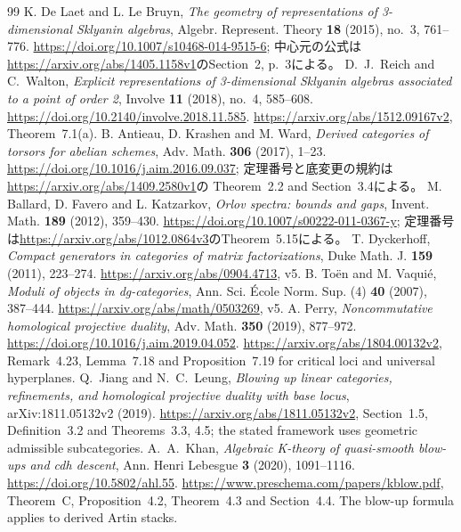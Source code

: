 \begin{thebibliography}{99}
 K. De Laet and L. Le Bruyn,
\emph{The geometry of representations of 3-dimensional Sklyanin algebras},
Algebr. Represent. Theory \textbf{18} (2015), no.~3, 761--776.
\url{https://doi.org/10.1007/s10468-014-9515-6};
中心元の公式は\url{https://arxiv.org/abs/1405.1158v1}のSection~2, p.~3による。
 D.~J.~Reich and C.~Walton,
\emph{Explicit representations of 3-dimensional Sklyanin algebras associated to a point of order 2},
Involve \textbf{11} (2018), no.~4, 585--608.
\url{https://doi.org/10.2140/involve.2018.11.585}.
\url{https://arxiv.org/abs/1512.09167v2}, Theorem~7.1(a).
 B. Antieau, D. Krashen and M. Ward,
\emph{Derived categories of torsors for abelian schemes},
Adv. Math. \textbf{306} (2017), 1--23.
\url{https://doi.org/10.1016/j.aim.2016.09.037};
定理番号と底変更の規約は\url{https://arxiv.org/abs/1409.2580v1}の
Theorem~2.2 and Section~3.4による。
 M. Ballard, D. Favero and L. Katzarkov,
\emph{Orlov spectra: bounds and gaps},
Invent. Math. \textbf{189} (2012), 359--430.
\url{https://doi.org/10.1007/s00222-011-0367-y};
定理番号は\url{https://arxiv.org/abs/1012.0864v3}のTheorem~5.15による。
 T. Dyckerhoff,
\emph{Compact generators in categories of matrix factorizations},
Duke Math. J. \textbf{159} (2011), 223--274.
\url{https://arxiv.org/abs/0904.4713}, v5.
 B. To\"en and M. Vaqui\'e,
\emph{Moduli of objects in dg-categories},
Ann. Sci. \'Ecole Norm. Sup. (4) \textbf{40} (2007), 387--444.
\url{https://arxiv.org/abs/math/0503269}, v5.
 A. Perry,
\emph{Noncommutative homological projective duality},
Adv. Math. \textbf{350} (2019), 877--972.
\url{https://doi.org/10.1016/j.aim.2019.04.052}.
\url{https://arxiv.org/abs/1804.00132v2},
Remark~4.23, Lemma~7.18 and Proposition~7.19 for critical loci and universal hyperplanes.
Q.~Jiang and N.~C.~Leung,
\emph{Blowing up linear categories, refinements, and homological projective duality with base locus},
arXiv:1811.05132v2 (2019).
\url{https://arxiv.org/abs/1811.05132v2},
Section~1.5, Definition~3.2 and Theorems~3.3, 4.5;
the stated framework uses geometric admissible subcategories.
A.~A.~Khan,
\emph{Algebraic K-theory of quasi-smooth blow-ups and cdh descent},
Ann. Henri Lebesgue \textbf{3} (2020), 1091--1116.
\url{https://doi.org/10.5802/ahl.55}.
\url{https://www.preschema.com/papers/kblow.pdf},
Theorem~C, Proposition~4.2, Theorem~4.3 and Section~4.4.
The blow-up formula applies to derived Artin stacks.

\end{thebibliography}
